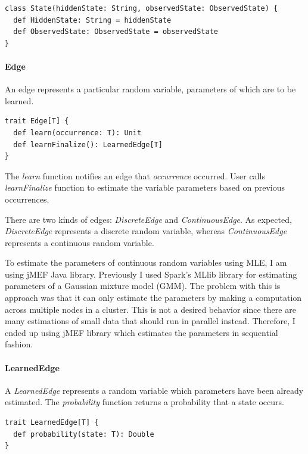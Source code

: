 \documentclass[thesis=B,english]{FITthesis}[2012/06/26]
\begin{document}
\begin{lstlisting}[style=myScalaStyle]
class State(hiddenState: String, observedState: ObservedState) {
  def HiddenState: String = hiddenState
  def ObservedState: ObservedState = observedState
}
\end{lstlisting}

\paragraph{Edge}

An edge represents a particular random variable, parameters of which are to be learned.

\begin{lstlisting}[style=myScalaStyle]
trait Edge[T] {
  def learn(occurrence: T): Unit
  def learnFinalize(): LearnedEdge[T]
}
\end{lstlisting}

The \textit{learn} function notifies an edge that \textit{occurrence} occurred. User calls \textit{learnFinalize} function to estimate the variable parameters based on previous occurrences.

There are two kinds of edges: \textit{DiscreteEdge} and \textit{ContinuousEdge}. As expected, \textit{DiscreteEdge} represents a discrete random variable, whereas \textit{ContinuousEdge} represents a continuous random variable.

To estimate the parameters of continuous random variables using MLE, I am using jMEF Java library. Previously I used Spark's MLlib library for estimating parameters of a Gaussian mixture model (GMM). The problem with this is approach was that it can only estimate the parameters by making a computation across multiple nodes in a cluster. This is not a desired behavior since there are many estimations of small data that should run in parallel instead. Therefore, I ended up using jMEF library which estimates the parameters in sequential fashion.

\paragraph{LearnedEdge}

A \textit{LearnedEdge} represents a random variable which parameters have been already estimated. The \textit{probability} function returns a probability that a state occurs.

\begin{lstlisting}[style=myScalaStyle]
trait LearnedEdge[T] {
  def probability(state: T): Double
}
\end{lstlisting}
\end{document}
